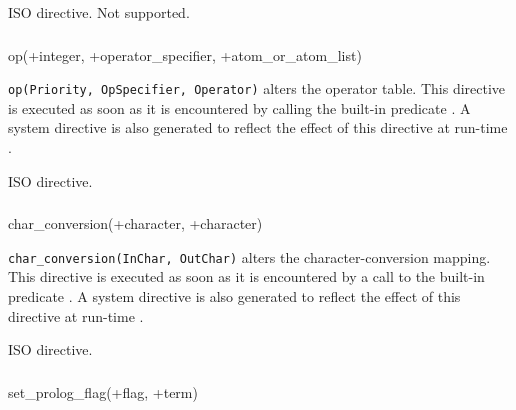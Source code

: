 \Portability

ISO directive. Not supported.

\subsubsection{ \label{op/3}}

\begin{TemplatesOneCol}
op(+integer, +operator\_specifier, +atom\_or\_atom\_list)

\end{TemplatesOneCol}

\Description

\texttt{op(Priority, OpSpecifier, Operator)} alters the operator table. This
directive is executed as soon as it is encountered by calling the built-in
predicate  . A system
directive is also generated to reflect the effect of this directive at
run-time .

\Portability

ISO directive.

\subsubsection{}

\begin{TemplatesOneCol}
char\_conversion(+character, +character)

\end{TemplatesOneCol}

\Description

\texttt{char\_conversion(InChar, OutChar)} alters the character-conversion
mapping. This directive is executed as soon as it is encountered by a call
to the built-in predicate 
. A system directive is also generated to reflect
the effect of this directive at run-time .

\Portability

ISO directive.

\subsubsection{}

\begin{TemplatesOneCol}
set\_prolog\_flag(+flag, +term)

\end{TemplatesOneCol}

